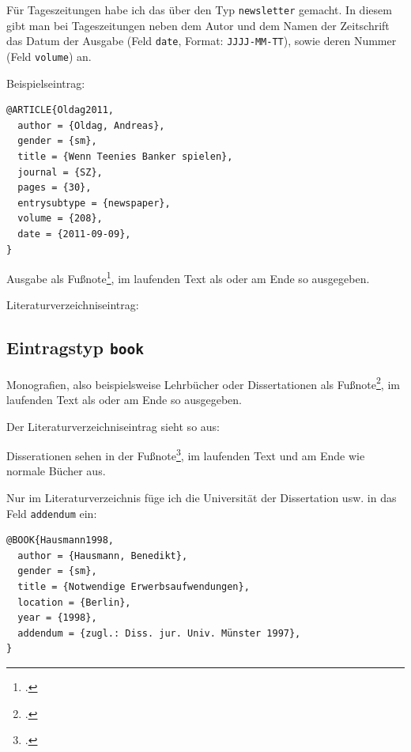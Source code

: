 Für Tageszeitungen habe ich das über den Typ \texttt{newsletter} gemacht. In diesem gibt man bei 
Tageszeitungen neben dem Autor und dem Namen der Zeitschrift das Datum der Ausgabe (Feld 
\texttt{date}, Format: \texttt{JJJJ-MM-TT}), sowie deren Nummer (Feld \texttt{volume}) an.


Beispielseintrag:

\begin{lstlisting}
@ARTICLE{Oldag2011,
  author = {Oldag, Andreas},
  gender = {sm},
  title = {Wenn Teenies Banker spielen},
  journal = {SZ},
  pages = {30},
  entrysubtype = {newspaper},
  volume = {208},
  date = {2011-09-09},
}
\end{lstlisting}

Ausgabe als Fußnote\footcite{Oldag2011}, im laufenden Text als
\cite{Oldag2011} oder am Ende so ausgegeben.~\parencite{Oldag2011}

Literaturverzeichniseintrag:

{}


\subsection{Eintragstyp \texttt{book}}


Monografien, also beispielsweise Lehrbücher oder Dissertationen  
als Fußnote\footcite[55]{Bruemmerhoff2007}, im laufenden Text als
\cite[55]{Bruemmerhoff2007} oder am Ende so ausgegeben.~\parencite[55]{Bruemmerhoff2007}

Der Literaturverzeichniseintrag sieht so aus:



Disserationen sehen in der Fußnote\footcite[231]{Hausmann1998}, im laufenden Text
\cite[231]{Hausmann1998} und am Ende wie normale Bücher aus.~\parencite[231]{Hausmann1998}

Nur im Literaturverzeichnis füge ich die Universität der Dissertation usw. in das Feld 
\texttt{addendum} ein:

\begin{lstlisting}
@BOOK{Hausmann1998,
  author = {Hausmann, Benedikt},
  gender = {sm},
  title = {Notwendige Erwerbsaufwendungen},
  location = {Berlin},
  year = {1998},
  addendum = {zugl.: Diss. jur. Univ. Münster 1997},
}
\end{lstlisting}

